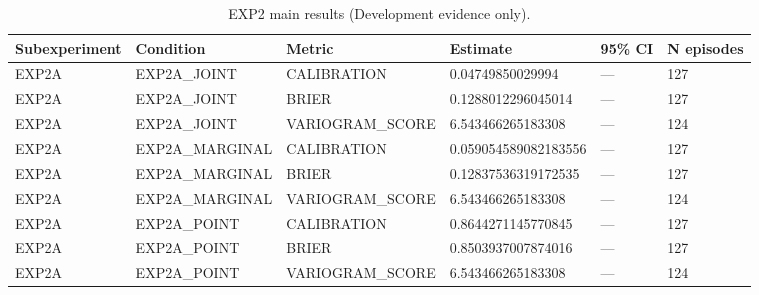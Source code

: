 \begin{table}[ht]
\caption{EXP2 main results (Development evidence only).}
\centering
\begin{tabular}{llllll}
\toprule
Subexperiment & Condition & Metric & Estimate & 95\% CI & N episodes \\
\midrule
EXP2A & EXP2A\_JOINT & CALIBRATION & 0.04749850029994 & — & 127 \\
EXP2A & EXP2A\_JOINT & BRIER & 0.1288012296045014 & — & 127 \\
EXP2A & EXP2A\_JOINT & VARIOGRAM\_SCORE & 6.543466265183308 & — & 124 \\
EXP2A & EXP2A\_MARGINAL & CALIBRATION & 0.059054589082183556 & — & 127 \\
EXP2A & EXP2A\_MARGINAL & BRIER & 0.12837536319172535 & — & 127 \\
EXP2A & EXP2A\_MARGINAL & VARIOGRAM\_SCORE & 6.543466265183308 & — & 124 \\
EXP2A & EXP2A\_POINT & CALIBRATION & 0.8644271145770845 & — & 127 \\
EXP2A & EXP2A\_POINT & BRIER & 0.8503937007874016 & — & 127 \\
EXP2A & EXP2A\_POINT & VARIOGRAM\_SCORE & 6.543466265183308 & — & 124 \\
\bottomrule
\end{tabular}
\end{table}
